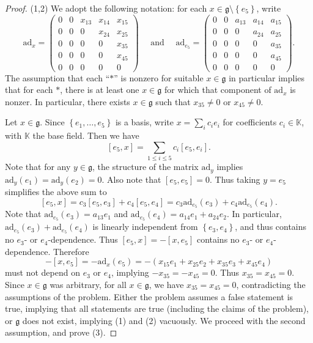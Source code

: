 \documentclass[11pt, letterpaper]{article}
\theoremstyle{plain}
\begin{document}
\begin{proof}
	(1,2) We adopt the following notation: for each $x\in \mathfrak{g}\setminus \left\{ e_5 \right\}  $, write
	\[
		\mathrm{ad} _x = \begin{pmatrix}
		0 & 0 & x_{13}  & x_{14}  & x_{15}  \\
		0 & 0 & 0 & x_{24}  & x_{25}  \\
		0 & 0 & 0 & 0 & x_{35}  \\
		0 & 0 & 0 & 0 & x_{45}  \\
		0 & 0 & 0 & 0 & 0
		\end{pmatrix}\quad \text{ and } \quad 
		\mathrm{ad} _{e_5} =\begin{pmatrix}
		0 & 0 & a_{13}  & a_{14}  & a_{15}  \\
		0 & 0 & 0 & a_{24}  & a_{25}  \\
		0 & 0 & 0 & 0 & a_{35}  \\
		0 & 0 & 0 & 0 & a_{45}  \\
		0 & 0 & 0 & 0 & 0
		\end{pmatrix}
	.\]
	The assumption that each ``$*$'' is nonzero for suitable $x\in \mathfrak{g} $ in particular implies that for each $*$, there is at least one $x\in \mathfrak{g} $ for which that component of $\mathrm{ad} _x$ is nonzer. In particular, there exists $x\in \mathfrak{g} $ such that $x_{35} \neq 0$ or $x_{45} \neq 0$.

	Let $x\in \mathfrak{g} $. Since $\left\{ e_1, \ldots ,e_5 \right\} $ is a basis, write $x = \sum_{i} c_ie_i$ for coefficients $c_i\in\mathbb{K} $, with $\mathbb{K} $ the base field. Then we have
	\[
		[e_5,x] = \sum_{1\leq i\leq 5} c_i [e_5,e_i]
	.\]
	Note that for any $y\in \mathfrak{g} $, the structure of the matrix $\mathrm{ad} _y$ implies $\mathrm{ad} _y(e_1) = \mathrm{ad} _y(e_2) = 0$. Also note that $[e_5,e_5]=0$. Thus taking $y=e_5$ simplifies the above sum to
	\[
		[e_5,x] = c_3[e_5,e_3] + c_4[e_5,e_4] = c_3\mathrm{ad}_{e_5} (e_3) + c_4 \mathrm{ad} _{e_5} (e_4)
	.\]
	Note that $\mathrm{ad} _{e_5} (e_3) = a_{13} e_1$ and $\mathrm{ad} _{e_5} (e_4) = a_{14} e_1 + a_{24} e_2$. In particular, $\mathrm{ad} _{e_5} (e_3) + \mathrm{ad} _{e_5} (e_4)$ is linearly independent from $\left\{ e_3,e_4 \right\} $, and thus contains no $e_3$- or $e_4$-dependence. Thus $[e_5,x] = -[x,e_5]$ contains no $e_3$- or $e_4$-dependence. Therefore
	\[
		-[x,e_5] = -\mathrm{ad} _x(e_5) = -\left( x_{15} e_1 + x_{25} e_2 + x_{35} e_3 + x_{45} e_4 \right) 
	\]
	must not depend on $e_3$ or $e_4$, implying $-x_{35} =-x_{45} =0$. Thus $x_{35} =x_{45} =0$. Since $x\in \mathfrak{g} $ was arbitrary, for all $x\in \mathfrak{g} $, we have $x_{35} =x_{45} =0$, contradicting the assumptions of the problem. Either the problem assumes a false statement is true, implying that all statements are true (including the claims of the problem), or $\mathfrak{g} $ does not exist, implying (1) and (2) vacuously. We proceed with the second assumption, and prove (3).


\end{proof}
\end{document}
